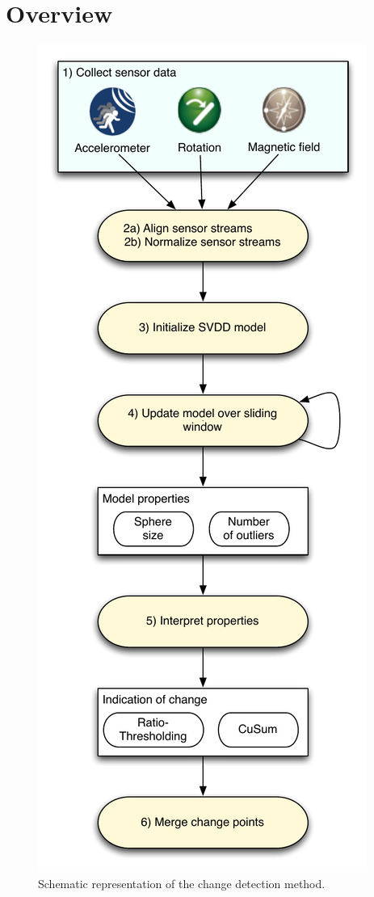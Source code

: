 \section{Overview}\label{sec:method_overview}

\begin{figure}
  \centering
    \includegraphics[width=\textwidth,height=\textheight,keepaspectratio]{./Figures/chapter4/method_setup.pdf}
  \caption[Method setup]{Schematic representation of the change detection method. }
  \label{fig:method_overview}
\end{figure}

